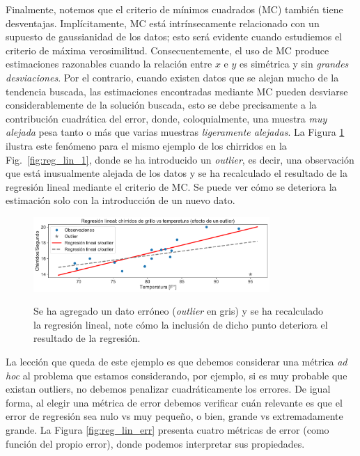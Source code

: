 Finalmente, notemos que el criterio de  mínimos cuadrados (MC) también tiene desventajas. Implícitamente, MC está intrínsecamente relacionado con un supuesto de gaussianidad de los datos; esto será evidente cuando estudiemos el criterio de máxima verosimilitud. Consecuentemente, el uso de MC produce estimaciones razonables cuando la relación entre $x$  e $y$ es simétrica y sin \emph{grandes desviaciones}. Por el contrario, cuando existen datos que se alejan mucho de la tendencia buscada, las estimaciones encontradas mediante MC pueden desviarse considerablemente de la solución buscada, esto se debe precisamente a la contribución cuadrática del error, donde, coloquialmente, una muestra \emph{muy alejada} pesa tanto o más que varias muestras \emph{ligeramente alejadas}. La Figura \ref{fig:reg_lin_2} ilustra este fenómeno para el mismo ejemplo de los chirridos en la Fig.~\ref{fig:reg_lin_1}, donde se ha introducido un \emph{outlier}, es decir, una observación que está inusualmente alejada de los datos y se ha recalculado el resultado de la regresión lineal mediante el criterio de MC. Se puede ver cómo se deteriora la estimación solo con la introducción de un nuevo dato. 

\begin{figure}[H]
	\centering
	\includegraphics[width=0.8\textwidth]{img/cap2_chirridos_outlier.pdf}\\
	\caption{Se ha agregado un dato erróneo (\emph{outlier} en gris) y se ha recalculado la regresión lineal, note cómo la inclusión de dicho punto deteriora el resultado de la regresión.}
	\label{fig:reg_lin_2}
\end{figure}

La lección que queda de este ejemplo es que debemos considerar una métrica \emph{ad hoc} al problema que estamos considerando, por ejemplo, si es muy probable que existan outliers, no debemos penalizar cuadráticamente los errores. De igual forma, al elegir una métrica de error debemos verificar cuán relevante es que el error de regresión sea nulo vs muy pequeño, o bien,  grande vs extremadamente grande. La Figura \ref{fig:reg_lin_err} presenta cuatro métricas de error (como función del propio error), donde podemos interpretar sus propiedades. 

